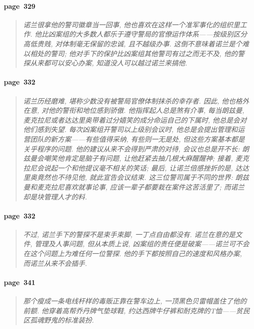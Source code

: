 \paragraph*{page~329}
\begin{quotation}
    \itshape
    诺兰很拿他的警司徽章当一回事, 他也喜欢在这样一个准军事化的组织里工作. 他比凶案组的大多数人都乐于遵守警局的官僚运作体系------按级别区分高低贵贱, 对体制毫无保留的忠诚, 且不越级办事. 这倒不意味着诺兰是个难以相处的警司; 他对手下的保护比凶案组其他警司有过之而无不及, 他的警探从来都可以安心办案, 知道没人可以越过诺兰来搞他. 
\end{quotation}

\paragraph*{page~332}
\begin{quotation}
    \itshape
    诺兰历经磨难, 堪称少数没有被警局官僚体制抹杀的幸存者. 因此, 他也格外在意, 对他的警衔和地位感到骄傲. 他指挥起人总是煞有介事, 每当朗兹曼, 麦克拉尼或者达达里奥带着过分嬉笑的成分命运自己的下属时, 他总是会对他们感到失望. 每次凶案组开警司以上级别会议时, 他总是会提出管理和运营团队的新方案------有些值得采纳, 有些则一无是处, 但这些方案基本都是关乎程序的问题. 他的建议从来不会得到严肃的对待, 会议也总是开不长: 朗兹曼会嘲笑他肯定是脑子有问题, 让他赶紧去抽几根大麻醒醒神; 接着, 麦克拉尼会说起一个和他提议毫不相关的笑话; 最后, 让诺兰倍感挫折的是, 达达里奥竟然也不待见他, 就此宣告会议结束. 这三位警司属于不同的世界: 朗兹曼和麦克拉尼喜欢就事论事, 应该一辈子都要栽在案件这苦活里了; 而诺兰却是块管理人才的料.
\end{quotation}

\paragraph*{page~332}
\begin{quotation}
    \itshape
    不过, 诺兰手下的警探不是束手束脚, 一丁点自由都没有. 诺兰在意的是文件, 管理及人事问题, 但从本质上说, 凶案组的责任便是破案------诺兰可不会在这个问题上为难任何一位警探. 他的手下都按照自己的速度和风格办案, 而诺兰从来不会插手. 
\end{quotation}

\paragraph*{page~341}
\begin{quotation}
    \itshape
    那个瘦成一条电线杆样的毒贩正靠在警车边上, 一顶黑色贝雷帽盖住了他的前额. 他穿着高帮乔丹牌气垫球鞋, 约达西牌牛仔裤和耐克牌的T恤------贫民区孤魂野鬼的标准装扮. 
\end{quotation}

